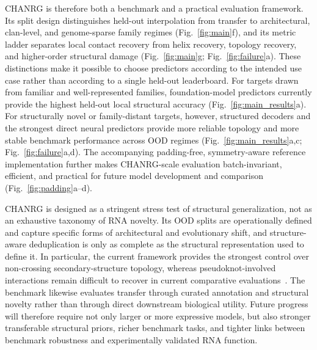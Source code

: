 \documentclass[pdflatex,sn-mathphys-num]{sn-jnl}%
\theoremstyle{thmstyleone}%
\theoremstyle{thmstyletwo}%
\theoremstyle{thmstylethree}%
\begin{document}
CHANRG is therefore both a benchmark and a practical evaluation framework.
Its split design distinguishes held-out interpolation from transfer to architectural, clan-level, and genome-sparse family regimes (Fig.~\ref{fig:main}f), and its metric ladder separates local contact recovery from helix recovery, topology recovery, and higher-order structural damage (Fig.~\ref{fig:main}g; Fig.~\ref{fig:failure}a).
These distinctions make it possible to choose predictors according to the intended use case rather than according to a single held-out leaderboard.
For targets drawn from familiar and well-represented families, foundation-model predictors currently provide the highest held-out local structural accuracy (Fig.~\ref{fig:main_results}a).
For structurally novel or family-distant targets, however, structured decoders and the strongest direct neural predictors provide more reliable topology and more stable benchmark performance across OOD regimes (Fig.~\ref{fig:main_results}a,c; Fig.~\ref{fig:failure}a,d).
The accompanying padding-free, symmetry-aware reference implementation further makes CHANRG-scale evaluation batch-invariant, efficient, and practical for future model development and comparison (Fig.~\ref{fig:padding}a--d).

CHANRG is designed as a stringent stress test of structural generalization, not as an exhaustive taxonomy of RNA novelty.
Its OOD splits are operationally defined and capture specific forms of architectural and evolutionary shift, and structure-aware deduplication is only as complete as the structural representation used to define it.
In particular, the current framework provides the strongest control over non-crossing secondary-structure topology, whereas pseudoknot-involved interactions remain difficult to recover in current comparative evaluations~\cite{justyna2023rna}.
The benchmark likewise evaluates transfer through curated annotation and structural novelty rather than through direct downstream biological utility.
Future progress will therefore require not only larger or more expressive models, but also stronger transferable structural priors, richer benchmark tasks, and tighter links between benchmark robustness and experimentally validated RNA function.

\backmatter
\end{document}

